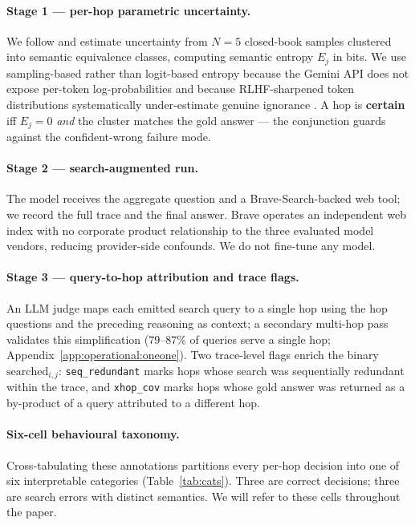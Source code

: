 \documentclass[10pt,letterpaper]{article}
\begin{document}
\paragraph{Stage 1 --- per-hop parametric uncertainty.}
We follow \citet{farquhar2024} and estimate uncertainty from $N{=}5$ closed-book
samples clustered into semantic equivalence classes, computing semantic entropy $E_j$
in bits. We use sampling-based rather than logit-based entropy because the Gemini API
does not expose per-token log-probabilities and because RLHF-sharpened token
distributions systematically under-estimate genuine ignorance
\citep{flare2023,farquhar2024}. A hop is \textbf{certain} iff $E_j = 0$ \emph{and} the
cluster matches the gold answer --- the conjunction guards against the confident-wrong
failure mode.

\paragraph{Stage 2 --- search-augmented run.}
The model receives the aggregate question and a Brave-Search-backed web tool; we
record the full trace and the final answer. Brave operates an independent web index
with no corporate product relationship to the three evaluated model vendors, reducing
provider-side confounds. We do not fine-tune any model.

\paragraph{Stage 3 --- query-to-hop attribution and trace flags.}
An LLM judge maps each emitted search query to a single hop using the hop questions and
the preceding reasoning as context; a secondary multi-hop pass validates this
simplification ($79$--$87\%$ of queries serve a single hop;
Appendix~\ref{app:operational:oneone}). Two trace-level flags enrich the binary
$\mathrm{searched}_{i,j}$: \texttt{seq\_redundant} marks hops whose search was
sequentially redundant within the trace, and \texttt{xhop\_cov} marks hops whose gold
answer was returned as a by-product of a query attributed to a different hop.

\paragraph{Six-cell behavioural taxonomy.}
Cross-tabulating these annotations partitions every per-hop decision into one of six
interpretable categories (Table~\ref{tab:cats}). Three are correct decisions; three
are search errors with distinct semantics. We will refer to these cells throughout the
paper.
\end{document}
